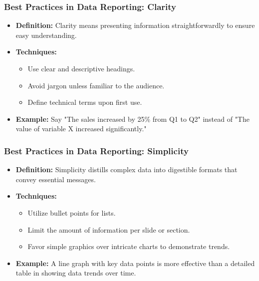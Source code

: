 \documentclass[aspectratio=169]{beamer}
\begin{document}
\begin{frame}[fragile]
    \frametitle{Best Practices in Data Reporting: Clarity}
    \begin{itemize}
        \item \textbf{Definition:} Clarity means presenting information straightforwardly to ensure easy understanding.
        \item \textbf{Techniques:}
        \begin{itemize}
            \item Use clear and descriptive headings.
            \item Avoid jargon unless familiar to the audience.
            \item Define technical terms upon first use.
        \end{itemize}
        \item \textbf{Example:} Say "The sales increased by 25\% from Q1 to Q2" instead of "The value of variable X increased significantly."
    \end{itemize}
\end{frame}

\begin{frame}[fragile]
    \frametitle{Best Practices in Data Reporting: Simplicity}
    \begin{itemize}
        \item \textbf{Definition:} Simplicity distills complex data into digestible formats that convey essential messages.
        \item \textbf{Techniques:}
        \begin{itemize}
            \item Utilize bullet points for lists.
            \item Limit the amount of information per slide or section.
            \item Favor simple graphics over intricate charts to demonstrate trends.
        \end{itemize}
        \item \textbf{Example:} A line graph with key data points is more effective than a detailed table in showing data trends over time.
    \end{itemize}
\end{frame}
\end{document}
